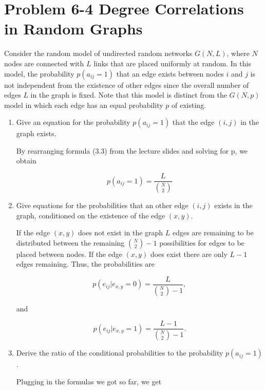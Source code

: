 \section*{Problem 6-4 Degree Correlations in Random Graphs}

Consider the random model of undirected random networks $G(N,L)$, where $N$ nodes are connected with $L$ links that are placed uniformly at random. In this model, the probability $p(a_{ij} = 1)$ that an edge exists between nodes $i$ and $j$ is not independent from the existence of other edges since the overall number of edges $L$ in the graph is fixed. Note that this model is distinct from the $G(N,p)$ model in which each edge has an equal probability $p$ of existing.

\begin{enumerate}
	\item Give an equation for the probability $p(a_{ij} = 1)$ that the edge $(i,j)$ in the graph exists.
	
	By rearranging formula (3.3) from the lecture slides and solving for p, we obtain
	
	\begin{equation}
	p(a_{ij} = 1) = \frac{L}{\binom{N}{2}}
	\end{equation}
	
	\item Give equations for the probabilities that an other edge $(i,j)$ exists in the graph, conditioned on the existence of the edge $(x,y)$.
	
	If the edge $(x,y)$ does not exist in the graph $L$ edges are remaining to be distributed between the remaining $\binom{N}{2} - 1$ possibilities for edges to be placed between nodes.  If the edge $(x,y)$ does exist there are only $L-1$ edges remaining. Thus, the probabilities are
	
	\begin{equation}
	p(e_{ij}|e_{x,y}=0) = \frac{L}{\binom{N}{2} - 1},
	\end{equation}
	
	and
	
	\begin{equation}
	p(e_{ij}|e_{x,y}=1) = \frac{L - 1}{\binom{N}{2} - 1}.
	\end{equation}
	
	\item Derive the ratio of the conditional probabilities to the probability $p(a_{ij} = 1)$.
	
	Plugging in the formulas we got so far,  we get
	

\end{enumerate}
